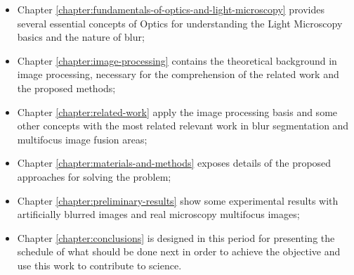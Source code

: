 \begin{itemize}
    \item Chapter \ref{chapter:fundamentals-of-optics-and-light-microscopy} provides several essential concepts of Optics for understanding the Light Microscopy basics and the nature of blur;
    
    \item Chapter \ref{chapter:image-processing} contains the theoretical background in image processing, necessary for the comprehension of the related work and the proposed methods;
    
    \item Chapter \ref{chapter:related-work} apply the image processing basis and some other concepts with the most related relevant work in blur segmentation and multifocus image fusion areas;
    
    \item Chapter
    \ref{chapter:materials-and-methods} exposes details of the proposed approaches for solving the problem;
    
    \item Chapter \ref{chapter:preliminary-results}
    show some experimental results with artificially blurred images and real microscopy multifocus images;
    
    \item Chapter \ref{chapter:conclusions} is designed in this period for presenting the schedule of what should be done next in order to achieve the objective and use this work to contribute to science.
    
\end{itemize}
